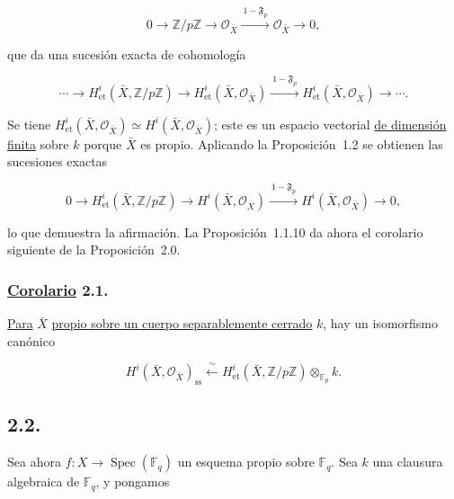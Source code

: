 \begin{equation}\tag{2.0.4}
0\longrightarrow\mathbb Z/p\mathbb Z\longrightarrow\mathcal O_{\bar X}
\xrightarrow{\ 1-\mathfrak F_p\ }\mathcal O_{\bar X}\longrightarrow0,
\end{equation}

que da una sucesión exacta de cohomología

\begin{equation}\tag{2.0.5}
\cdots\longrightarrow H^i_{\mathrm{et}}(\bar X,\mathbb Z/p\mathbb Z)
\longrightarrow H^i_{\mathrm{et}}(\bar X,\mathcal O_{\bar X})
\xrightarrow{\ 1-\mathfrak F_p\ }
H^i_{\mathrm{et}}(\bar X,\mathcal O_{\bar X})\longrightarrow\cdots .
\end{equation}

Se tiene
$H^i_{\mathrm{et}}(\bar X,\mathcal O_{\bar X})\simeq
H^i(\bar X,\mathcal O_{\bar X})$; este es un espacio vectorial \underline{de
dimensión finita} sobre $k$ porque $\bar X$ es propio. Aplicando la
Proposición~1.2 se obtienen las sucesiones exactas

\pageoriginale

\begin{equation}\tag{2.0.6}
0\longrightarrow H^i_{\mathrm{et}}(\bar X,\mathbb Z/p\mathbb Z)
\longrightarrow H^i(\bar X,\mathcal O_{\bar X})
\xrightarrow{\ 1-\mathfrak F_p\ }
H^i(\bar X,\mathcal O_{\bar X})\longrightarrow0,
\end{equation}

lo que demuestra la afirmación. La Proposición~1.1.10 da ahora el
corolario siguiente de la Proposición~2.0.

\subsubsection*{\underline{Corolario} 2.1.}
\underline{Para} $\bar X$ \underline{propio sobre un cuerpo separablemente cerrado} $k$, hay un
isomorfismo canónico

\begin{equation}\tag{2.1.1}
H^i(\bar X,\mathcal O_{\bar X})_{\mathrm{ss}}
\xleftarrow{\ \sim\ }
H^i_{\mathrm{et}}(\bar X,\mathbb Z/p\mathbb Z)
\otimes_{\mathbb F_p}k.
\end{equation}

\subsection*{2.2.}
Sea ahora $f:X\longrightarrow\operatorname{Spec}(\mathbb F_q)$ un esquema propio sobre
$\mathbb F_q$. Sea $k$ una clausura algebraica de $\mathbb F_q$, y
pongamos

